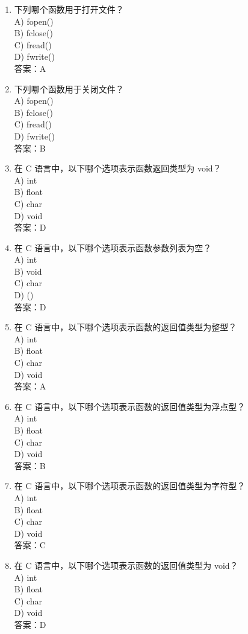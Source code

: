 \documentclass[a4paper,12pt]{article}
\begin{document}
\begin{enumerate}
    \item 下列哪个函数用于打开文件？\\
    A) fopen() \\
    B) fclose() \\
    C) fread() \\
    D) fwrite() \\
    答案：A

    \item 下列哪个函数用于关闭文件？\\
    A) fopen() \\
    B) fclose() \\
    C) fread() \\
    D) fwrite() \\
    答案：B

    \item 在 C 语言中，以下哪个选项表示函数返回类型为 void？\\
    A) int \\
    B) float \\
    C) char \\
    D) void \\
    答案：D

    \item 在 C 语言中，以下哪个选项表示函数参数列表为空？\\
    A) int \\
    B) void \\
    C) char \\
    D) () \\
    答案：D

    \item 在 C 语言中，以下哪个选项表示函数的返回值类型为整型？\\
    A) int \\
    B) float \\
    C) char \\
    D) void \\
    答案：A

    \item 在 C 语言中，以下哪个选项表示函数的返回值类型为浮点型？\\
    A) int \\
    B) float \\
    C) char \\
    D) void \\
    答案：B

    \item 在 C 语言中，以下哪个选项表示函数的返回值类型为字符型？\\
    A) int \\
    B) float \\
    C) char \\
    D) void \\
    答案：C

    \item 在 C 语言中，以下哪个选项表示函数的返回值类型为 void？\\
    A) int \\
    B) float \\
    C) char \\
    D) void \\
    答案：D
\end{enumerate}
\end{document}
